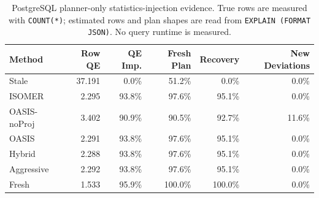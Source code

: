 \begin{table}[t]
  \centering
  \small
  \caption{PostgreSQL planner-only statistics-injection evidence. True rows are measured with \texttt{COUNT(*)}; estimated rows and plan shapes are read from \texttt{EXPLAIN (FORMAT JSON)}. No query runtime is measured.}
  \label{tab:postgres_planner_stats_injection}
  \setlength{\tabcolsep}{4pt}
  \begin{tabular}{lrrrrr}
    \toprule
    Method & Row QE & QE Imp. & Fresh Plan & Recovery & New Deviations \\
    \midrule
    Stale & 37.191 & 0.0\% & 51.2\% & 0.0\% & 0.0\% \\
    ISOMER & 2.295 & 93.8\% & 97.6\% & 95.1\% & 0.0\% \\
    OASIS-noProj & 3.402 & 90.9\% & 90.5\% & 92.7\% & 11.6\% \\
    OASIS & 2.291 & 93.8\% & 97.6\% & 95.1\% & 0.0\% \\
    Hybrid & 2.288 & 93.8\% & 97.6\% & 95.1\% & 0.0\% \\
    Aggressive & 2.292 & 93.8\% & 97.6\% & 95.1\% & 0.0\% \\
    Fresh & 1.533 & 95.9\% & 100.0\% & 100.0\% & 0.0\% \\
    \bottomrule
  \end{tabular}
\end{table}
